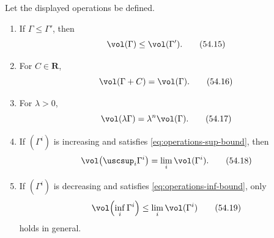 \begin{theorem}\label{thm:operations-volume}
Let the displayed operations be defined.
\begin{enumerate}
\item If $\Gamma\leq\Gamma'$, then
      \[
                         \vol(\Gamma)\leq\vol(\Gamma').
      \tag{54.15}\label{eq:operations-volume-order}
      \]
\item For $C\in\mathbf R$,
      \[
                         \vol(\Gamma+C)=\vol(\Gamma).
      \tag{54.16}\label{eq:operations-volume-translation}
      \]
\item For $\lambda>0$,
      \[
                         \vol(\lambda\Gamma)
                         =\lambda^n\vol(\Gamma).
      \tag{54.17}\label{eq:operations-volume-scale}
      \]
\item If $(\Gamma^i)$ is increasing and satisfies
      \eqref{eq:operations-sup-bound}, then
      \[
      \vol\!\left(\uscsup_i\Gamma^i\right)
                       =\lim_i\vol(\Gamma^i).
      \tag{54.18}\label{eq:operations-volume-increasing}
      \]
\item If $(\Gamma^i)$ is decreasing and satisfies
      \eqref{eq:operations-inf-bound}, only
      \[
      \vol\!\left(\inf_i\Gamma^i\right)
                       \leq\lim_i\vol(\Gamma^i)
      \tag{54.19}\label{eq:operations-volume-decreasing}
      \]
      holds in general.
\end{enumerate}
\par
\end{theorem}


